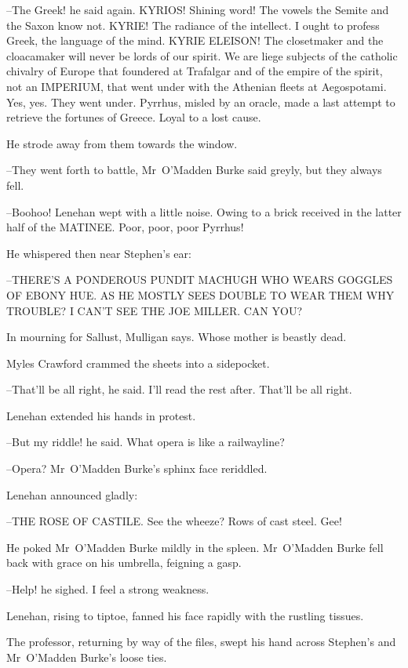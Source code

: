 --The Greek!
he said again.
KYRIOS!
Shining word!
The vowels the Semite and the Saxon know not.
KYRIE!
The radiance of the intellect.
I ought to profess Greek, the language of the mind.
KYRIE ELEISON!
The closetmaker and the cloacamaker will never be lords of our spirit.
We are liege subjects of the catholic chivalry of Europe that foundered at Trafalgar
and of the empire of the spirit,
not an IMPERIUM,
that went under with the Athenian fleets at Aegospotami.
Yes, yes.
They went under.
Pyrrhus,
misled by an oracle,
made a last attempt to retrieve the fortunes of Greece.
Loyal to a lost cause.

He strode away from them towards the window.

--They went forth to battle,
Mr~O'Madden Burke said greyly,
but they always fell.

--Boohoo!
Lenehan wept with a little noise.
Owing to a brick received in the latter half of the MATINEE.
Poor, poor, poor Pyrrhus!

He whispered then near Stephen's ear:



  --THERE'S A PONDEROUS PUNDIT MACHUGH
    WHO WEARS GOGGLES OF EBONY HUE.
    AS HE MOSTLY SEES DOUBLE
    TO WEAR THEM WHY TROUBLE?
    I CAN'T SEE THE JOE MILLER. CAN YOU?

In mourning for Sallust,
Mulligan says.
Whose mother is beastly dead.

Myles Crawford crammed the sheets into a sidepocket.

--That'll be all right,
he said.
I'll read the rest after.
That'll be all right.

Lenehan extended his hands in protest.

--But my riddle!
he said.
What opera is like a railwayline?

--Opera?
Mr~O'Madden Burke's sphinx face reriddled.

Lenehan announced gladly:

--THE ROSE OF CASTILE.
See the wheeze?
Rows of cast steel.
Gee!

He poked Mr~O'Madden Burke mildly in the spleen.
Mr~O'Madden Burke fell back with grace on his umbrella,
feigning a gasp.

--Help!
he sighed.
I feel a strong weakness.

Lenehan,
rising to tiptoe,
fanned his face rapidly with the rustling tissues.

The professor,
returning by way of the files,
swept his hand across Stephen's and Mr~O'Madden Burke's loose ties.

